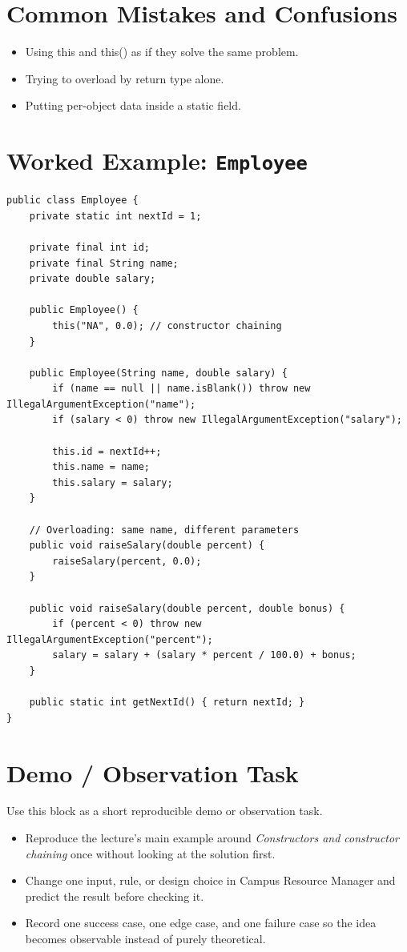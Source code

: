\documentclass[11pt]{article}
\begin{document}
\section{Common Mistakes and Confusions}
\begin{itemize}
  \item Using this and this() as if they solve the same problem.
  \item Trying to overload by return type alone.
  \item Putting per-object data inside a static field.
\end{itemize}
\notesources{\OOPSUnitIISources}

\section{Worked Example: \texttt{Employee}}
\begin{lstlisting}
public class Employee {
    private static int nextId = 1;

    private final int id;
    private final String name;
    private double salary;

    public Employee() {
        this("NA", 0.0); // constructor chaining
    }

    public Employee(String name, double salary) {
        if (name == null || name.isBlank()) throw new IllegalArgumentException("name");
        if (salary < 0) throw new IllegalArgumentException("salary");

        this.id = nextId++;
        this.name = name;
        this.salary = salary;
    }

    // Overloading: same name, different parameters
    public void raiseSalary(double percent) {
        raiseSalary(percent, 0.0);
    }

    public void raiseSalary(double percent, double bonus) {
        if (percent < 0) throw new IllegalArgumentException("percent");
        salary = salary + (salary * percent / 100.0) + bonus;
    }

    public static int getNextId() { return nextId; }
}
\end{lstlisting}

\section{Demo / Observation Task}
Use this block as a short reproducible demo or observation task.
\begin{itemize}
  \item Reproduce the lecture's main example around \textit{Constructors and constructor chaining} once without looking at the solution first.
  \item Change one input, rule, or design choice in Campus Resource Manager and predict the result before checking it.
  \item Record one success case, one edge case, and one failure case so the idea becomes observable instead of purely theoretical.
\end{itemize}
\notesources{\OOPSUnitIISources}
\end{document}
